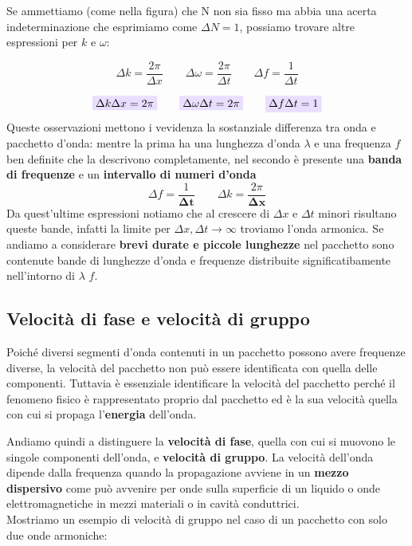 \documentclass[x11names]{report}
\newcommand{\viola}[1]{\colorbox{yred}{$\displaystyle #1$}}
\begin{document}
	Se ammettiamo (come nella figura) che N non sia fisso ma abbia una acerta indeterminazione che esprimiamo come \(\Delta N = 1\), possiamo trovare altre espressioni per \(k\) e \(\omega\):
	
	\[ 
	\boxed{\Delta k = \frac{2\pi}{\Delta x}} \qquad \boxed{ \Delta\omega = \frac{2\pi}{\Delta t}} \qquad \boxed{\Delta f = \frac{1}{\Delta t}}
	\]
	
	\[ 
	\viola{\Delta k \Delta x = 2\pi} \qquad \viola{\Delta \omega \Delta t = 2\pi} \qquad \viola{\Delta f \Delta t = 1}
	\]
	Queste osservazioni mettono i vevidenza la sostanziale differenza tra onda e pacchetto d'onda: mentre la prima ha una lunghezza d'onda \(\lambda\)  e una frequenza \(f\) ben definite che la descrivono completamente, nel secondo è presente una \textbf{banda di frequenze} e un \textbf{intervallo di numeri d'onda}
	\[ 
	\Delta f = \frac{1}{\boldsymbol{\Delta t}} \qquad \Delta k = \frac{2\pi}{\boldsymbol{\Delta x}}
	\]
	Da quest'ultime espressioni notiamo che al crescere di \(\Delta x\) e \(\Delta t\) minori risultano queste bande, infatti la limite per \(\Delta x,\Delta t \to \infty\) troviamo l'onda armonica. Se andiamo a considerare \textbf{brevi durate e piccole lunghezze} nel pacchetto sono contenute bande di lunghezze d'onda e frequenze distribuite significatibamente nell'intorno di \(\lambda\) \(f\).
	
	\subsection{Velocità di fase e velocità di gruppo}
	Poiché diversi segmenti d'onda contenuti in un pacchetto possono avere frequenze diverse, la velocità del pacchetto non può essere identificata con quella delle componenti. Tuttavia è essenziale identificare la velocità del pacchetto perché il fenomeno fisico è rappresentato proprio dal pacchetto ed è la sua velocità quella con cui si propaga l'\textbf{energia} dell'onda.     
	
	Andiamo quindi a distinguere la \textbf{velocità di fase}, quella con cui si muovono le singole componenti dell'onda, e \textbf{velocità di gruppo}. 
	La velocità dell'onda dipende dalla frequenza quando la propagazione avviene in un \textbf{mezzo dispersivo} come può avvenire per onde sulla superficie di un liquido o onde elettromagnetiche in mezzi materiali o in cavità conduttrici.\\
	
	\noindent
	Mostriamo un esempio di velocità di gruppo nel caso di un pacchetto con solo due onde armoniche:
	
\end{document}
